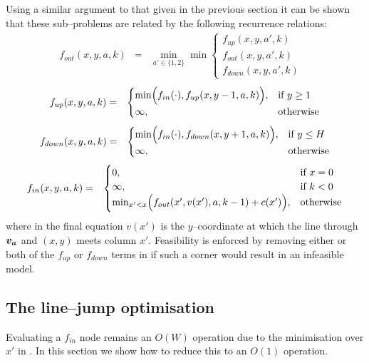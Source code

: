 Using a similar argument to that given in the previous section it can
be shown that these sub--problems are related by the following
recurrence relations:
\begin{eqnarray}
  \label{eq:fout-recurrence}
    f_{out}(x,y,a,k) &=& \min_{a'\in\{1,2\}} \min
      \begin{cases}
        f_{up}(x,y,a',k) & \\
        f_{out}(x,y,a',k) & \\
        f_{down}(x,y,a',k) &
      \end{cases}
\end{eqnarray}
\begin{eqnarray}
  \label{eq:fup-recurrence}
  f_{up}(x,y,a,k) &=& 
  \begin{cases}
    \min \Bigl(f_{in}(\cdot), f_{up}(x,y-1,a,k)\Bigr), &
    \mbox{if } y \geq 1 \\
    \infty, & \mbox{otherwise}
  \end{cases}
\end{eqnarray}
\begin{eqnarray}
  \label{eq:fdown-recurrence}
  f_{down}(x,y,a,k) &=& 
  \begin{cases}
    \min \Bigl(f_{in}(\cdot), f_{down}(x,y+1,a,k)\Bigr), &
    \mbox{if } y \leq H \\
    \infty, & \mbox{otherwise}
  \end{cases}
\end{eqnarray}
\begin{eqnarray}
  \label{eq:fin-recurrence-basic}
  f_{in}(x,y,a,k) &=&
  \begin{cases}
    0, & \mbox{if } x=0 \\
    \infty, & \mbox{if } k<0 \\
    \min_{x'<x}\Bigl(f_{out}(x',v(x'),a,k-1)+c(x')\Bigr), &
    \mbox{otherwise}
  \end{cases}
\end{eqnarray}
where in the final equation $v(x')$ is the $y$--coordinate at which
the line through $\boldsymbol{v_a}$ and $(x,y)$ meets column
$x'$. Feasibility is enforced by removing either or both of the $f_{up}$
or $f_{down}$ terms in  if such a corner would
result in an infeasible model.

\subsection{The line--jump optimisation}
Evaluating a $f_{in}$ node remains an $O(W)$ operation due to the
minimisation over $x'$ in . In this
section we show how to reduce this to an $O(1)$ operation.

